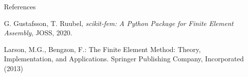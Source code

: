 \documentclass{beamer}
\begin{document}
\begin{frame}{References}
\begin{thebibliography}{5}

 G. Gustafsson, T. Ruubel, \emph{scikit-fem: A Python Package for Finite Element Assembly}, JOSS, 2020.

Larson, M.G., Bengzon, F.: The Finite Element Method: Theory, Implementation, and Applications. Springer Publishing Company, Incorporated (2013)

\end{thebibliography}
\end{frame}

\begin{frame}{}

    
\end{frame}
\end{document}
